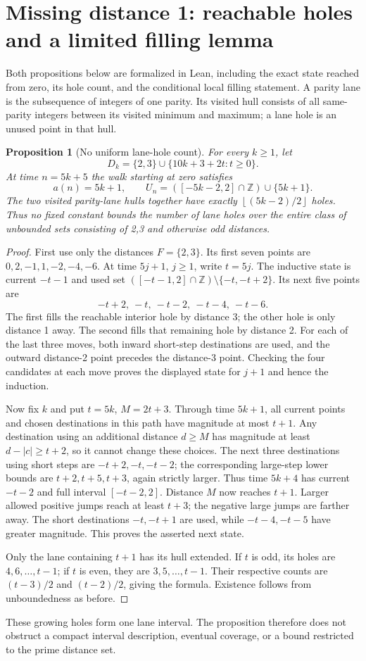 \documentclass[11pt,a4paper]{article}
\newtheorem{proposition}[theorem]{Proposition}
\newcommand{\Z}{\mathbb Z}\newcommand{\N}{\mathbb N}
\newcommand{\floor}[1]{\left\lfloor #1\right\rfloor}
\begin{document}
\section{Missing distance 1: reachable holes and a limited filling lemma}
\label{sec:parity}
Both propositions below are formalized in Lean, including the exact
state reached from zero, its hole count, and the conditional local filling statement.
A parity lane is the subsequence of integers of one parity. Its visited
hull consists of all same-parity integers between its visited minimum and
maximum; a lane hole is an unused point in that hull.

\begin{proposition}[No uniform lane-hole count]\label{prop:many-holes}
For every $k\ge1$, let
\[
 D_k=\{2,3\}\cup\{10k+3+2t:t\ge0\}.
\]
At time $n=5k+5$ the walk starting at zero satisfies
\[
 a(n)=5k+1,\qquad
 U_n=([-5k-2,2]\cap\Z)\cup\{5k+1\}.
\]
The two visited parity-lane hulls together have exactly
$\floor{(5k-2)/2}$ holes. Thus no fixed constant bounds the number of
lane holes over the entire class of unbounded sets consisting of 2,3
and otherwise odd distances.
\end{proposition}
\begin{proof}
First use only the distances $F=\{2,3\}$. Its first seven points are
$0,2,-1,1,-2,-4,-6$. At time $5j+1$, $j\ge1$, write $t=5j$.
The inductive state is current $-t-1$ and used set
$([-t-1,2]\cap\Z)\setminus\{-t,-t+2\}$. Its next five points are
\[
 -t+2,\ -t,\ -t-2,\ -t-4,\ -t-6.
\]
The first fills the reachable interior hole by distance 3; the other hole
is only distance 1 away. The second fills that remaining hole by distance 2.
For each of the last three moves, both inward short-step destinations are
used, and the outward distance-2 point precedes the distance-3 point.
Checking the four candidates at each move proves the displayed state
for $j+1$ and hence the induction.

Now fix $k$ and put $t=5k$, $M=2t+3$. Through time $5k+1$, all current points
and chosen destinations in this path have magnitude at most $t+1$.
Any destination using an additional distance $d\ge M$ has magnitude
at least $d-|c|\ge t+2$, so it cannot change these choices.
The next three destinations using short steps are $-t+2,-t,-t-2$; the corresponding
large-step lower bounds are $t+2,t+5,t+3$, again strictly larger.
Thus time $5k+4$ has current $-t-2$ and full interval $[-t-2,2]$.
Distance $M$ now reaches $t+1$. Larger allowed positive jumps reach
at least $t+3$; the negative large jumps are farther away. The short
destinations $-t,-t+1$ are used, while $-t-4,-t-5$ have greater magnitude.
This proves the asserted next state.

Only the lane containing $t+1$ has its hull extended. If $t$ is odd,
its holes are $4,6,\ldots,t-1$; if $t$ is even, they are
$3,5,\ldots,t-1$. Their respective counts are $(t-3)/2$ and $(t-2)/2$,
giving the formula. Existence follows from unboundedness as before.
\end{proof}
These growing holes form one lane interval. The proposition therefore
does not obstruct a compact interval description, eventual coverage, or
a bound restricted to the prime distance set.
\end{document}
